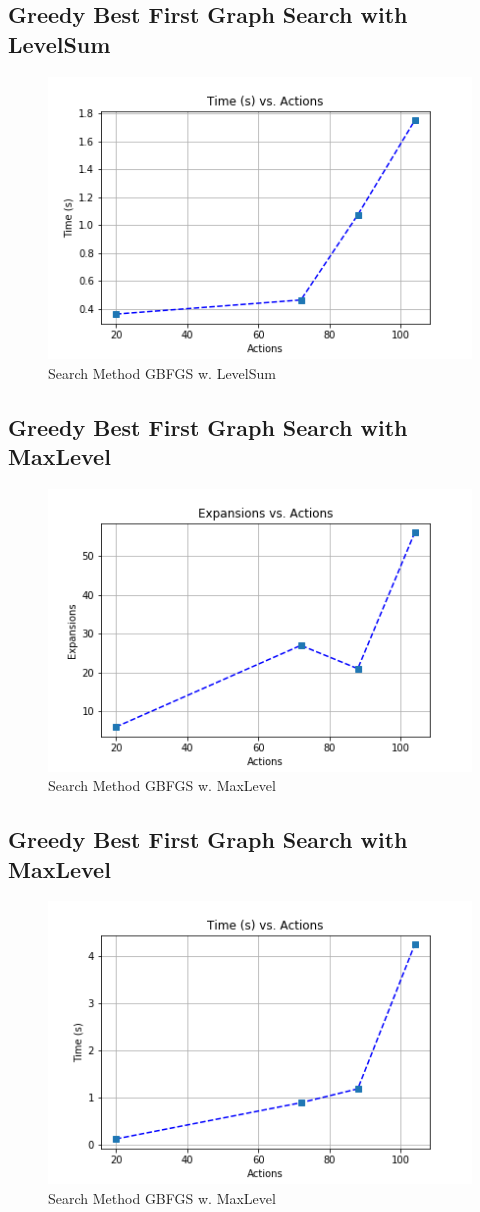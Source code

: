 \documentclass[a4paper]{article}
\begin{document}
\subsection{Greedy Best First Graph Search with LevelSum}

\begin{figure}[htpb]
\begin{center}
\includegraphics[width=0.5\columnwidth]{fig/results_131.png}
\caption{Search Method GBFGS w. LevelSum}
\end{center}
\label{fig131}
\end{figure}
        

\subsection{Greedy Best First Graph Search with MaxLevel}

\begin{figure}[htpb]
\begin{center}
\includegraphics[width=0.5\columnwidth]{fig/results_234.png}
\caption{Search Method GBFGS w. MaxLevel}
\end{center}
\label{fig234}
\end{figure}
        

\subsection{Greedy Best First Graph Search with MaxLevel}

\begin{figure}[htpb]
\begin{center}
\includegraphics[width=0.5\columnwidth]{fig/results_231.png}
\caption{Search Method GBFGS w. MaxLevel}
\end{center}
\label{fig231}
\end{figure}
        
\end{document}
